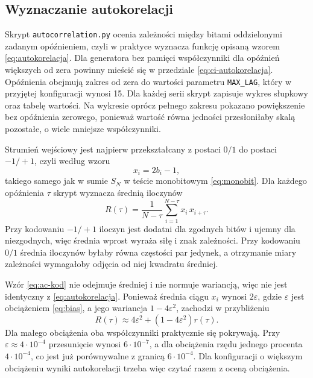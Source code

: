 \subsection{Wyznaczanie autokorelacji}

Skrypt \texttt{autocorrelation.py} ocenia zależności między bitami oddzielonymi
zadanym opóźnieniem, czyli w praktyce wyznacza funkcję opisaną wzorem
\eqref{eq:autokorelacja}. Dla generatora bez pamięci współczynniki dla
opóźnień większych od zera powinny mieścić się w przedziale
\eqref{eq:ci-autokorelacja}. Opóźnienia obejmują zakres od zera do wartości
parametru \texttt{MAX\_LAG}, który w przyjętej konfiguracji wynosi 15. Dla
każdej serii skrypt zapisuje wykres słupkowy oraz tabelę wartości. Na wykresie
oprócz pełnego zakresu pokazano powiększenie bez opóźnienia zerowego, ponieważ
wartość równa jedności przesłoniłaby skalą pozostałe, o wiele mniejsze
współczynniki.

Strumień wejściowy jest najpierw przekształcany z postaci $0/1$ do postaci
$-1/+1$, czyli według wzoru
%
\begin{equation}
  x_i = 2b_i - 1 ,
  \label{eq:ac-przeksztalcenie}
\end{equation}
%
takiego samego jak w sumie $S_N$ w teście monobitowym \eqref{eq:monobit}.
Dla każdego opóźnienia $\tau$ skrypt wyznacza średnią iloczynów
%
\begin{equation}
  R(\tau) = \frac{1}{N-\tau}\sum_{i=1}^{N-\tau} x_i\, x_{i+\tau} .
  \label{eq:ac-kod}
\end{equation}
%
Przy kodowaniu $-1/+1$ iloczyn jest dodatni dla zgodnych bitów i ujemny dla
niezgodnych, więc średnia wprost wyraża siłę i znak zależności. Przy kodowaniu
$0/1$ średnia iloczynów byłaby równa częstości par jedynek, a otrzymanie
miary zależności wymagałoby odjęcia od niej kwadratu średniej.

Wzór \eqref{eq:ac-kod} nie odejmuje średniej i nie normuje wariancją, więc nie
jest identyczny z \eqref{eq:autokorelacja}. Ponieważ średnia ciągu $x_i$ wynosi
$2\varepsilon$, gdzie $\varepsilon$ jest obciążeniem \eqref{eq:bias}, a jego
wariancja $1-4\varepsilon^2$, zachodzi w przybliżeniu
%
\begin{equation}
  R(\tau) \approx 4\varepsilon^2 + \left(1-4\varepsilon^2\right) r(\tau) .
  \label{eq:ac-przyblizenie}
\end{equation}
%
Dla małego obciążenia oba współczynniki praktycznie się pokrywają. Przy
$\varepsilon \approx 4\cdot 10^{-4}$ przesunięcie wynosi $6\cdot 10^{-7}$,
a dla obciążenia rzędu jednego procenta $4\cdot 10^{-4}$, co jest już
porównywalne z granicą $6\cdot 10^{-4}$. Dla konfiguracji o większym
obciążeniu wyniki autokorelacji trzeba więc czytać razem z oceną obciążenia.

